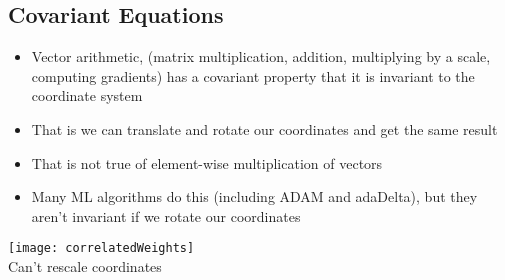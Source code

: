 
\begin{slide}
\section[-2]{Covariant Equations}

\begin{PauseHighLight}
  \begin{minipage}{0.6\linewidth}
      \begin{itemize}
      \item Vector arithmetic, (matrix multiplication, addition,
        multiplying by a scale, computing gradients) has a covariant property that it is
        invariant to the coordinate system\pause
      \item That is we can translate and rotate our coordinates and get
        the same result\pause
      \item That is not true of element-wise multiplication of
        vectors\pause
      \item Many ML algorithms do this (including ADAM and adaDelta), but
        they aren't invariant if we rotate our coordinates\pause
      \end{itemize}
    \end{minipage}\hfil
    \begin{minipage}{0.35\linewidth}
      \begin{center}
        \texttt{[image: correlatedWeights]}\pauseb\\
        Can't rescale coordinates\pauseb
      \end{center}
    \end{minipage}
\end{PauseHighLight}

\end{slide}



